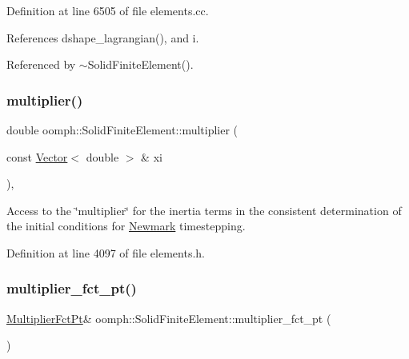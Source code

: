 Definition at line 6505 of file elements.\+cc.



References dshape\+\_\+lagrangian(), and i.



Referenced by $\sim$\+Solid\+Finite\+Element().

\mbox{\label{classoomph_1_1SolidFiniteElement_ab07798fe92a5bf61903b41209f67fbbf}} 
\subsubsection{\texorpdfstring{multiplier()}{multiplier()}}
{\footnotesize\ttfamily double oomph\+::\+Solid\+Finite\+Element\+::multiplier (\begin{DoxyParamCaption}\item[{const \hyperlink{classoomph_1_1Vector}{Vector}$<$ double $>$ \&}]{xi }\end{DoxyParamCaption})\hspace{0.3cm}{\ttfamily [inline]}, {\ttfamily [private]}}



Access to the \char`\"{}multiplier\char`\"{} for the inertia terms in the consistent determination of the initial conditions for \hyperlink{classoomph_1_1Newmark}{Newmark} timestepping. 



Definition at line 4097 of file elements.\+h.

\mbox{\label{classoomph_1_1SolidFiniteElement_a5d35600dc2300c2fafff585d9cb4020d}} 
\subsubsection{\texorpdfstring{multiplier\+\_\+fct\+\_\+pt()}{multiplier\_fct\_pt()}\hspace{0.1cm}{\footnotesize\ttfamily [1/2]}}
{\footnotesize\ttfamily \hyperlink{classoomph_1_1SolidFiniteElement_a1ec1cdf98041a51f77aab2b892856fc4}{Multiplier\+Fct\+Pt}\& oomph\+::\+Solid\+Finite\+Element\+::multiplier\+\_\+fct\+\_\+pt (\begin{DoxyParamCaption}{ }\end{DoxyParamCaption})\hspace{0.3cm}{\ttfamily [inline]}}



